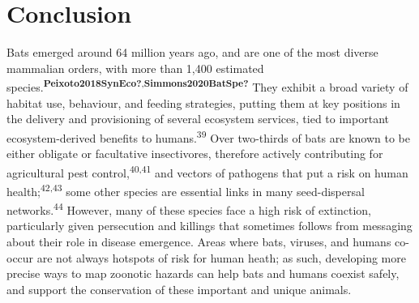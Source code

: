 \documentclass[10pt,oneside]{article}
\begin{document}
\hypertarget{conclusion}{%
\section{Conclusion}\label{conclusion}}

Bats emerged around 64 million years ago, and are one of the most
diverse mammalian orders, with more than 1,400 estimated
species.\textsuperscript{\textbf{Peixoto2018SynEco?},\textbf{Simmons2020BatSpe?}}
They exhibit a broad variety of habitat use, behaviour, and feeding
strategies, putting them at key positions in the delivery and
provisioning of several ecosystem services, tied to important
ecosystem-derived benefits to humans.\textsuperscript{39} Over
two-thirds of bats are known to be either obligate or facultative
insectivores, therefore actively contributing for agricultural pest
control,\textsuperscript{40,41} and vectors of pathogens that put a risk
on human health;\textsuperscript{42,43} some other species are essential
links in many seed-dispersal networks.\textsuperscript{44} However, many
of these species face a high risk of extinction, particularly given
persecution and killings that sometimes follows from messaging about
their role in disease emergence. Areas where bats, viruses, and humans
co-occur are not always hotspots of risk for human heath; as such,
developing more precise ways to map zoonotic hazards can help bats and
humans coexist safely, and support the conservation of these important
and unique animals.
\end{document}
